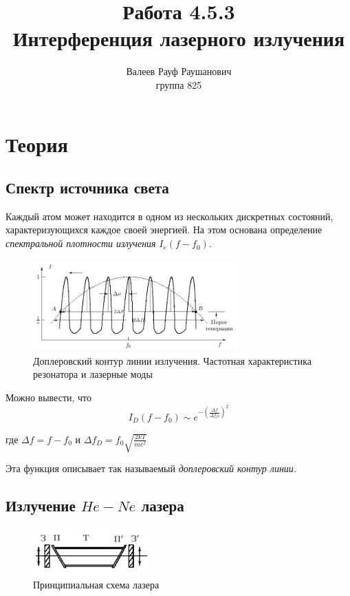 \documentclass[a4paper, 12pt]{article}%
\author{Валеев Рауф Раушанович \\
группа 825}
\title{\textbf{Работа 4.5.3\\Интерференция лазерного излучения}}
\date{}
\begin{document}
\maketitle
\section*{Теория}
\subsection*{Спектр источника света}
Каждый атом может находится в одном из нескольких дискретных состояний, характеризующихся каждое своей энергией. На этом основана определение \textit{спектральной плотности излучения} $I_e(f - f_0)$.

\begin{figure}[h]
\begin{center}
\includegraphics[width = 0.7\textwidth]{1.png}
\caption{Доплеровский контур линии излучения. Частотная характеристика резонатора и лазерные моды}
\end{center}
\end{figure}

Можно вывести, что 
\begin{equation}
I_D(f-f_0) \sim e^{-\left(\frac{\Delta f}{\Delta f_D}\right)^2}
\end{equation}

где $\Delta f = f - f_0$ и $\Delta f_D = f_0 \sqrt{\frac{2kT}{mc^2}}$

Эта функция описывает так называемый \textit{доплеровский контур линии}.
\newpage
\subsection*{Излучение $He-Ne$ лазера}

\begin{figure}
  \begin{center}
    \includegraphics[width = 0.4\textwidth]{2.png}
  \end{center}
  \caption{Принципиальная схема лазера}
\end{figure}
\end{document}
